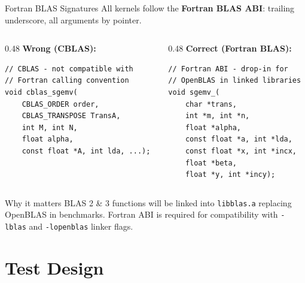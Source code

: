 \documentclass[aspectratio=169,10pt]{beamer}
\begin{document}
\begin{frame}[fragile]{Fortran BLAS Signatures}
  All kernels follow the \textbf{Fortran BLAS ABI}: trailing underscore, all arguments by pointer.

  \begin{columns}[T]
    \begin{column}{0.48\textwidth}
      \textbf{Wrong (CBLAS):}
      \begin{lstlisting}
// CBLAS - not compatible with
// Fortran calling convention
void cblas_sgemv(
    CBLAS_ORDER order,
    CBLAS_TRANSPOSE TransA,
    int M, int N,
    float alpha,
    const float *A, int lda, ...);
      \end{lstlisting}
    \end{column}
    \begin{column}{0.48\textwidth}
      \textbf{Correct (Fortran BLAS):}
      \begin{lstlisting}
// Fortran ABI - drop-in for
// OpenBLAS in linked libraries
void sgemv_(
    char *trans,
    int *m, int *n,
    float *alpha,
    const float *a, int *lda,
    const float *x, int *incx,
    float *beta,
    float *y, int *incy);
      \end{lstlisting}
    \end{column}
  \end{columns}
  \vspace{0.3em}
  \begin{exampleblock}{Why it matters}
    BLAS 2 \& 3 functions will be linked into \texttt{libblas.a} replacing OpenBLAS in benchmarks. Fortran ABI is required for compatibility with \texttt{-lblas} and \texttt{-lopenblas} linker flags.
  \end{exampleblock}
\end{frame}

\section{Test Design}
\end{document}
